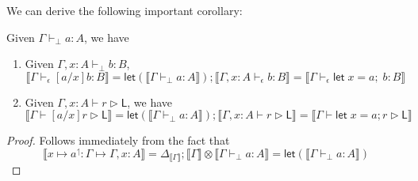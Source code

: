 \documentclass[acmsmall,screen,review]{acmart}
\newcommand{\ms}[1]{\ensuremath{\mathsf{#1}}}
\newcommand{\letexpr}[3]{\ensuremath{\ms{let}\;#1 = #2;\;#3}}
\newcommand{\letstmt}[3]{\ensuremath{\ms{let}\;#1 = #2; #3}}
\newcommand{\lupg}[1]{{#1}^\upharpoonleft}
\newcommand{\bhyp}[2]{#1 : #2}
\newcommand{\hasty}[4]{#1 \vdash_{#2} #3: {#4}}
\newcommand{\haslb}[3]{#1 \vdash #2 \rhd #3}
\newcommand{\issubst}[3]{#1: #2 \mapsto #3}
\newcommand{\dnt}[1]{\llbracket{#1}\rrbracket}
\newcommand{\lmor}[1]{\ms{let}(#1)}
\begin{document}
We can derive the following important corollary:
\begin{corollary}
  Given $\hasty{\Gamma}{\bot}{a}{A}$, we have
  \begin{enumerate}
    \item Given $\hasty{\Gamma, \bhyp{x}{A}}{\bot}{b}{B}$,
    \begin{equation}
      \dnt{\hasty{\Gamma}{\epsilon}{[a/x]b}{B}}
      = \lmor{\dnt{\hasty{\Gamma}{\bot}{a}{A}}} 
        ; \dnt{\hasty{\Gamma, \bhyp{x}{A}}{\epsilon}{b}{B}}
      = \dnt{\hasty{\Gamma}{\epsilon}{\letexpr{x}{a}{b}}{B}}
    \end{equation}
    \item Given $\haslb{\Gamma, \bhyp{x}{A}}{r}{\ms{L}}$, we have
    \begin{equation}
      \dnt{\haslb{\Gamma}{[a/x]r}{\ms{L}}}
      = \lmor{\dnt{\hasty{\Gamma}{\bot}{a}{A}}}
        ; \dnt{\haslb{\Gamma, \bhyp{x}{A}}{r}{\ms{L}}}
      = \dnt{\haslb{\Gamma}{\letstmt{x}{a}{r}}{\ms{L}}}
    \end{equation}
  \end{enumerate}
  \label{corr:single-subst}
\end{corollary}
\begin{proof}
  Follows immediately from the fact that 
  \begin{equation}
    \dnt{\issubst{\lupg{x \mapsto a}}{\Gamma}{\Gamma, \bhyp{x}{A}}} 
    = \Delta_{\dnt{\Gamma}} ; \dnt{\Gamma} \otimes \dnt{\hasty{\Gamma}{\bot}{a}{A}}
    = \lmor{\dnt{\hasty{\Gamma}{\bot}{a}{A}}}
  \end{equation}
\end{proof}
\end{document}
